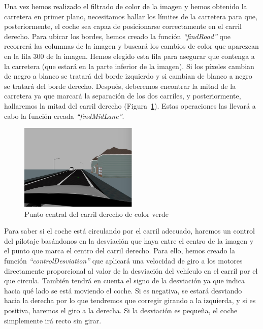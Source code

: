 Una vez hemos realizado el filtrado de color de la imagen y hemos obtenido la carretera en primer plano, necesitamos hallar los límites de la carretera para que, posteriormente, el coche sea capaz de posicionarse correctamente en el carril derecho. Para ubicar los bordes, hemos creado la función \textit{``findRoad''} que recorrerá las columnas de la imagen y buscará los cambios de color que aparezcan en la fila 300 de la imagen. Hemos elegido esta fila para asegurar que contenga a la carretera (que estará en la parte inferior de la imagen). Si los píxeles cambian de negro a blanco se tratará del borde izquierdo y si cambian de blanco a negro se tratará del borde derecho. Después, deberemos encontrar la mitad de la carretera ya que marcará la separación de los dos carriles, y posteriormente, hallaremos la mitad del carril derecho (Figura~\ref{fig.desv}). Estas operaciones las llevará a cabo la función creada \textit{``findMidLane''}. \\

\begin{figure}[H]
  \begin{center}
    \includegraphics[width=0.5\textwidth]{figures/Stop/desv.png}
		\caption{Punto central del carril derecho de color verde}
		\label{fig.desv}
		\end{center}
\end{figure}

Para saber si el coche está circulando por el carril adecuado, haremos un control del pilotaje basándonos en la desviación que haya entre el centro de la imagen y el punto que marca el centro del carril derecho. Para ello, hemos creado la función \textit{``controlDesviation''} que aplicará una velocidad de giro a los motores directamente proporcional al valor de la desviación del vehículo en el carril por el que circula. También tendrá en cuenta el signo de la desviación ya que indica hacia qué lado se está moviendo el coche. Si es negativa, se estará desviando hacia la derecha por lo que tendremos que corregir girando a la izquierda, y si es positiva, haremos el giro a la derecha. Si la desviación es pequeña, el coche simplemente irá recto sin girar.

